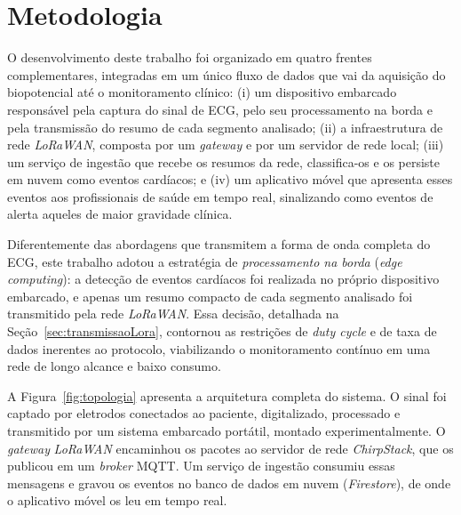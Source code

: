 \chapter{Metodologia}
\label{chap:metodologia}

O desenvolvimento deste trabalho foi organizado em quatro frentes complementares, integradas em um único fluxo de dados que vai da aquisição do biopotencial até o monitoramento clínico: (i) um dispositivo embarcado responsável pela captura do sinal de \acs{ECG}, pelo seu processamento na borda e pela transmissão do resumo de cada segmento analisado; (ii) a infraestrutura de rede \textit{LoRaWAN}, composta por um \textit{gateway} e por um servidor de rede local; (iii) um serviço de ingestão que recebe os resumos da rede, classifica-os e os persiste em nuvem como eventos cardíacos; e (iv) um aplicativo móvel que apresenta esses eventos aos profissionais de saúde em tempo real, sinalizando como eventos de alerta aqueles de maior gravidade clínica.

Diferentemente das abordagens que transmitem a forma de onda completa do \acs{ECG}, este trabalho adotou a estratégia de \textit{processamento na borda} (\textit{edge computing}): a detecção de eventos cardíacos foi realizada no próprio dispositivo embarcado, e apenas um resumo compacto de cada segmento analisado foi transmitido pela rede \textit{LoRaWAN}. Essa decisão, detalhada na Seção~\ref{sec:transmissaoLora}, contornou as restrições de \textit{duty cycle} e de taxa de dados inerentes ao protocolo, viabilizando o monitoramento contínuo em uma rede de longo alcance e baixo consumo.

A Figura~\ref{fig:topologia} apresenta a arquitetura completa do sistema. O sinal foi captado por eletrodos conectados ao paciente, digitalizado, processado e transmitido por um sistema embarcado portátil, montado experimentalmente. O \textit{gateway} \textit{LoRaWAN} encaminhou os pacotes ao servidor de rede \textit{ChirpStack}, que os publicou em um \textit{broker} \acs{MQTT}. Um serviço de ingestão consumiu essas mensagens e gravou os eventos no banco de dados em nuvem (\textit{Firestore}), de onde o aplicativo móvel os leu em tempo real.

